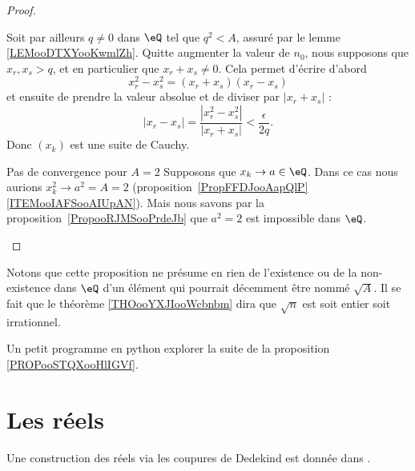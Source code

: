 \begin{proof}
\begin{subproof}
            Soit par ailleurs \( q\neq 0\) dans \( \eQ\) tel que \( q^2<A\), assuré par le lemme \ref{LEMooDTXYooKwmlZh}. Quitte augmenter la valeur de \( n_0\), nous supposons que \( x_r,x_s>q\), et en particulier que \( x_r+x_s\neq 0\). Cela permet d'écrire d'abord
            \begin{equation}
                x_r^2-x_s^2=(x_r+x_s)(x_r-x_s)
            \end{equation}
            et ensuite de prendre la valeur absolue et de diviser par \( | x_r+x_s |\) :
            \begin{equation}
                | x_r-x_s |=\frac{ | x_r^2-x_s^2 | }{ | x_r+x_s | }<\frac{ \epsilon }{ 2q }.
            \end{equation}
            Donc \( (x_k)\) est une suite de Cauchy.
        \item[Pas de convergence pour \( A=2\)]
            Supposons que \( x_k\to a\in \eQ\). Dans ce cas nous aurions \( x_k^2\to a^2=A=2\) (proposition~\ref{PropFFDJooAapQlP}\ref{ITEMooIAFSooAIUpAN}). Mais nous savons par la proposition~\ref{PropooRJMSooPrdeJb} que \( a^2=2\) est impossible dans \( \eQ\).
    \end{subproof}
\end{proof}

Notons que cette proposition ne présume en rien de l'existence ou de la non-existence dans \( \eQ\) d'un élément qui pourrait décemment être nommé \( \sqrt{ A }\). Il se fait que le théorème \ref{THOooYXJIooWcbnbm} dira que \( \sqrt{ n }\) est soit entier soit irrationnel.

\begin{normaltext}
    Un petit programme en python explorer la suite de la proposition \ref{PROPooSTQXooHlIGVf}.
    
\end{normaltext}

\section{Les réels}

Une construction des réels via les coupures de Dedekind est donnée dans \cite{PaulinTopGmVegN}.

